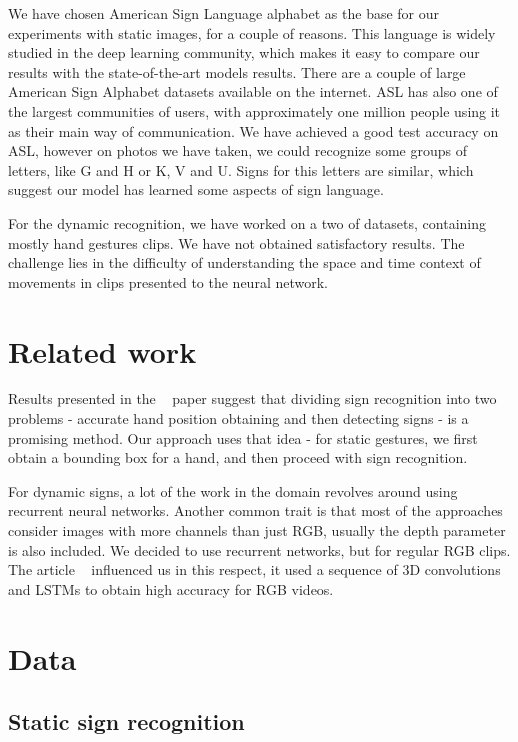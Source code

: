 \documentclass[10pt,twocolumn,letterpaper]{article}
\begin{document}
We have chosen American Sign Language alphabet as the base for our experiments with static images, for a couple of reasons.
This language is widely studied in the deep learning community, which makes it easy to compare our results with the state-of-the-art models results.
There are a couple of large American Sign Alphabet datasets available on the internet.
ASL has also one of the largest communities of users, with approximately one million people using it as their main way of communication.
We have achieved a good test accuracy on ASL, however on photos we have taken, we could
recognize some groups of letters, like G and H or K, V and U. Signs for this letters are similar, which suggest our model has learned some aspects of sign language.

For the dynamic recognition, we have worked on a two of datasets, containing mostly hand gestures clips.
We have not obtained satisfactory results.
The challenge lies in the difficulty of understanding the space and time context of movements in clips presented to the neural network.


\section{Related work}

Results presented in the ~\cite{Google_signs} paper suggest that dividing sign recognition
into two problems - accurate hand position obtaining and then detecting signs -
is a promising method. Our approach uses that idea - for static
gestures, we first obtain a bounding box for a hand, and then proceed with
sign recognition. 

For dynamic signs, a lot of the work in the domain revolves around using
recurrent neural networks.
Another common trait is that most of the approaches consider images with more channels than just RGB, usually the depth parameter is also included.
We decided to use recurrent networks, but for regular RGB clips.
The article ~\cite{Jester_dynamic} influenced us in this respect, it used a sequence of 3D convolutions and LSTMs to obtain high accuracy for RGB videos. 


\section{Data}

\subsection{Static sign recognition}
\end{document}
